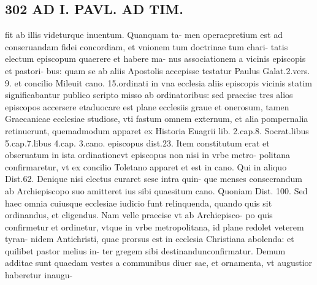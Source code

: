 \documentclass{article}
\begin{document}
\begin{pages}
\section*{302 AD I. PAVL. AD TIM. }\pstart fit ab illis videturque inuentum. Quanquam ta- men operaepretium est ad conseruandam fidei concordiam, et vnionem tum doctrinae tum chari- tatis electum episcopum quaerere et habere ma- nus associationem a vicinis episcopis et pastori- bus: quam se ab aliis Apostolis accepisse testatur Paulus Galat.2.vers. 9. et concilio Mileuit cano. 15.ordinati in vna ecclesia aliis episcopis vicinis statim significabantur publico scripto misso ab ordinatoribus: sed praecise tres alios episcopos accersere etaduocare est plane ecclesiis graue et onerosum, tamen Graecanicae ecclesiae studiose, vti fastum omnem externum, et alia pompernalia retinuerunt, quemadmodum apparet ex Historia Euagrii lib. 2.cap.8. Socrat.libus 5.cap.7.libus 4.cap. 3.cano. episcopus dist.23. Item constitutum erat et obseruatum in ista ordinationevt episcopus non nisi in vrbe metro- politana confirmaretur, vt ex concilio Toletano apparet et est in cano. Qui in aliquo Dist.62. Denique nisi electus curaret sese intra quin- que menses consecrandum ab Archiepiscopo suo amitteret ius sibi quaesitum cano. Quoniam Dist. 100. Sed haec omnia cuiusque ecclesiae iudicio funt relinquenda, quando quis sit ordinandus, et cligendus. Nam velle praecise vt ab Archiepisco- po quis confirmetur et ordinetur, vtque in vrbe metropolitana, id plane redolet veterem tyran- nidem Antichristi, quae prorsus est in ecclesia Christiana abolenda: et quilibet pastor melius in- ter gregem sibi destinandunconfirmatur. Demum additae sunt quaedam vestes a communibus diuer sae, et ornamenta, vt augustior haberetur inaugu-  \pend

\end{pages}
\end{document}
